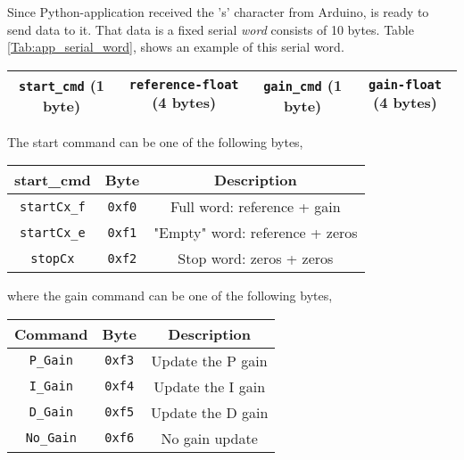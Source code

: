 Since Python-application received the 's' character from Arduino, is ready to send data to it. That data is a fixed serial \textit{word} consists of 10 bytes. Table \ref{Tab:app_serial_word}, shows an example of this serial word.

\begin{center}
	 \label{Tab:app_serial_word}
	\begin{tabular}{|c|c|c|c|}
		\hline 
		\texttt{start\_cmd} (1 byte) & \texttt{reference-float} (4 bytes) & \texttt{gain\_cmd} (1 byte) & \texttt{gain-float} (4 bytes) \\
		\hline
	\end{tabular}
\end{center}

\noindent The start command can be one of the following bytes,

\begin{center}
	 \label{Tab:start_cmd}
	\begin{tabular}{|c|c|c|}
		\hline 
		\textbf{start\_cmd} & \textbf{Byte} & \textbf{Description} \\
		\hline
		\texttt{startCx\_f} & \texttt{0xf0} & Full word: reference + gain \\
		\hline 
		\texttt{startCx\_e} & \texttt{0xf1} & "Empty" word: reference + zeros\\
		\hline
		\texttt{stopCx} & \texttt{0xf2} & Stop word: zeros + zeros \\
		\hline	
	\end{tabular}
\end{center}

\noindent where the gain command can be one of the following bytes,

\begin{center}
	 \label{Tab:gain_cmd}
	\begin{tabular}{|c|c|c|}
		\hline 
		\textbf{Command} & \textbf{Byte} & \textbf{Description} \\
		\hline
		\texttt{P\_Gain} & \texttt{0xf3} & Update the P gain \\
		\hline 
		\texttt{I\_Gain} & \texttt{0xf4} & Update the I gain\\
		\hline
		\texttt{D\_Gain} & \texttt{0xf5} & Update the D gain \\
		\hline
		\texttt{No\_Gain} & \texttt{0xf6} & No gain update \\
		\hline
	\end{tabular}
\end{center}

